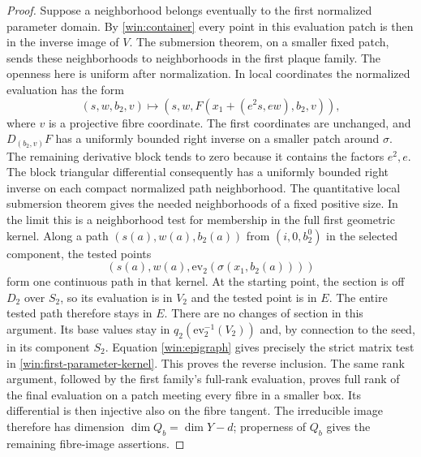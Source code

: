 \begin{proof}
Suppose a neighborhood belongs eventually to the first normalized
parameter domain.  By \eqref{win:container} every point in this
evaluation patch is then in the inverse image of $V$.  The
submersion theorem, on a smaller fixed patch, sends these
neighborhoods to neighborhoods in the first plaque family.
The openness here is uniform after normalization.  In local
coordinates the normalized evaluation has the form
\[
 (s,w,b_2,v)\longmapsto
 (s,w,F(x_1+(e^2s,ew),b_2,v)),
\]
where $v$ is a projective fibre coordinate.  The first coordinates
are unchanged, and $D_{(b_2,v)}F$ has a uniformly bounded right
inverse on a smaller patch around $\sigma$.  The remaining
derivative block tends to zero because it contains the factors
$e^2,e$.  The block triangular differential consequently has a
uniformly bounded right inverse on each compact normalized path
neighborhood.  The quantitative local submersion theorem gives
the needed neighborhoods of a fixed positive size.  In the limit
this is a neighborhood test for membership in the full first
geometric kernel.  Along a path $(s(a),w(a),b_2(a))$ from
$(i,0,b_2^0)$ in the selected component,
the tested points
\[
       (s(a),w(a),\mathrm{ev}_2(\sigma(x_1,b_2(a))))
\]
form one continuous path in that kernel.  At the starting point,
the section is off $D_2$ over $S_2$, so its evaluation is in $V_2$
and the tested point is in $E$.  The entire tested path therefore
stays in $E$.  There are no changes of section in this argument.
Its base values stay in $q_2(\mathrm{ev}_2^{-1}(V_2))$ and, by
connection to the seed, in its component $S_2$.  Equation
\eqref{win:epigraph} gives precisely the strict matrix test in
\eqref{win:first-parameter-kernel}.  This proves the reverse
inclusion.  The same rank argument, followed by the first family's
full-rank evaluation, proves full rank of the final evaluation on
a patch meeting every fibre in a smaller box.  Its differential is
then injective also on the fibre tangent.  The irreducible image
therefore has dimension $\dim Q_b=\dim Y-d$; properness of $Q_b$
gives the remaining fibre-image assertions.


\end{proof}
